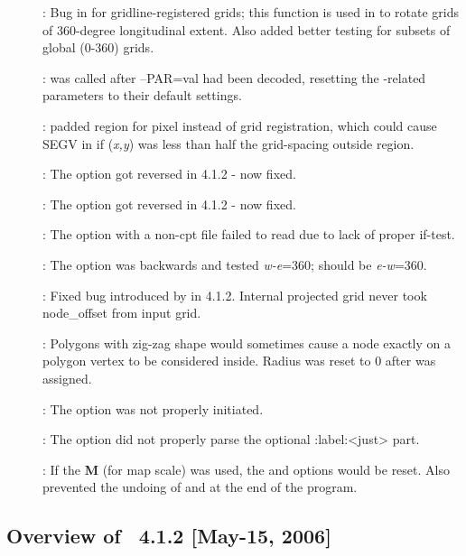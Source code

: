 \begin{description}
\item []: Bug in  for gridline-registered grids; this function is used in
 to rotate grids of 360-degree longitudinal extent. Also added better testing for subsets of global (0-360) grids.
\item []:  was called after --PAR=val had been decoded, resetting
the \PS-related parameters to their default settings.
\item []:  padded region for pixel instead of grid registration,
which could cause SEGV in  if ({\it x,y}) was less than half the grid-spacing outside region.
\item []: The  option got reversed in 4.1.2 - now fixed.
\item []: The  option got reversed in 4.1.2 - now fixed.
\item []: The  option with a non-cpt file failed to read due to lack of proper if-test.
\item []: The  option was backwards and tested {\it w-e}=360; should be {\it e-w}=360.
\item []: Fixed bug introduced by  in 4.1.2. Internal projected
grid never took node\_offset from input grid.
\item []: Polygons with zig-zag shape would sometimes cause a node exactly
on a polygon vertex to be considered inside. Radius was reset to 0 after  was assigned.
\item []: The  option was not properly initiated.
\item []: The  option did not properly parse the optional :label:<just> part.
\item []: If the {\bf M} (for map scale) was used, the  and  options would be reset.
Also prevented the undoing of  and  at the end of the program.
\end{description}


\subsection{Overview of \gmt\ 4.1.2 [May-15, 2006]}

